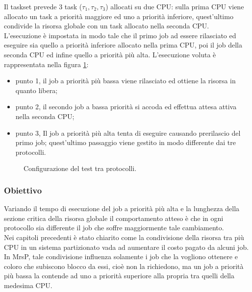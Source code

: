{\noindent Il taskset prevede 3 task ($\tau_1, \tau_2, \tau_3$) allocati su due CPU: sulla prima CPU viene allocato un task a priorità maggiore ed uno a priorità inferiore, quest'ultimo condivide la risorsa globale con un task allocato nella seconda CPU.\\

\noindent L'esecuzione è impostata in modo tale che il primo job ad essere rilasciato ed eseguire sia quello a priorità inferiore allocato nella prima CPU, poi il job della seconda CPU ed infine quello a priorità più alta. L'esecuzione voluta è rappresentata nella figura \ref{fig:test_protocols}: 

\begin{itemize}
  \item punto {\color{red} 1}, il job a priorità più bassa viene rilasciato ed ottiene la risorsa in quanto libera;
  \item punto {\color{red} 2}, il secondo job a bassa priorità si accoda ed effettua attesa attiva nella seconda CPU;
  \item punto {\color{red} 3}, Il job a priorità più alta tenta di eseguire causando prerilascio del primo job; quest'ultimo passaggio viene gestito in modo differente dai tre protocolli.\\
\end{itemize}

\begin{figure}
\centering
{}
\caption{Configurazione del test tra protocolli.}
\label{fig:test_protocols}
\end{figure}

\subsubsection{Obiettivo}
\label{sec:confronto_protocolli_ob}

\noindent Variando il tempo di esecuzione del job a priorità più alta e la lunghezza della sezione critica della risorsa globale il comportamento atteso è che in ogni protocollo sia differente il job che soffre maggiormente tale cambiamento.\\

\noindent Nei capitoli precedenti è stato chiarito come la condivisione della risorsa tra più CPU in un sistema partizionato vada ad aumentare il costo pagato da alcuni job. In MrsP, tale condivisione influenza solamente i job che la vogliono ottenere e coloro che subiscono blocco da essi, cioè non la richiedono, ma un job a priorità più bassa la contende ad uno a priorità superiore alla propria tra quelli della medesima CPU.\\

}
